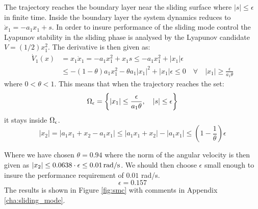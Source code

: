 The trajectory reaches the boundary layer near the sliding surface where $|s| \leq \epsilon$ in finite time. Inside the boundary layer the system dynamics reduces to $\dot{x}_1 = -a_1 x_1 + s$. In order to insure performance of the sliding mode control the Lyapunov stability in the sliding phase is analysed by the Lyapunov candidate $V = (1/2) x_1^2$. The derivative is then given as:
\begin{equation}
        \begin{split}
                \dot{V}_1(x) &= x_1 \dot{x}_1 = -a_1 x_1^2 + x_1 s \leq -a_1 x_1^2 + |x_1| \epsilon \\
                &\leq -(1-\theta)a_1 x_1^2 - \theta a_1|x_1|^2 + |x_1|\epsilon \leq 0 \quad \forall \quad |x_1| \geq \frac{\epsilon}{a_1 \theta}
        \end{split}
\end{equation}
where $0 < \theta < 1$. This means that when the trajectory reaches the set:
\begin{equation}
        \Omega_{\mathrm{\epsilon}} = \left\{|x_1| \leq \frac{\epsilon}{a_1 \theta}, \quad |s| \leq \epsilon \right\}
\end{equation}
it stays inside $\Omega_{\mathrm{\epsilon}}$. 
\begin{equation}
        |x_2| = |a_1 x_1 + x_2 - a_1 x_1| \leq |a_1 x_1 + x_2| - |a_1 x_1| \leq \left(1 - \frac{1}{\theta}\right)\epsilon
\end{equation}

Where we have chosen $\theta = 0.94$ where the norm of the angular velocity is then given as $|x_2| \leq 0.0638 \cdot \epsilon \leq 0.01 \, \text{rad/s}$. We should then choose $\epsilon$ small enough to insure the performance requirement of $0.01$ rad/s.
\begin{equation}
         \epsilon = 0.157 \nonumber
 \end{equation} 
 The results is shown in Figure \ref{fig:smc} with comments in Appendix \ref{cha:sliding_mode}.

